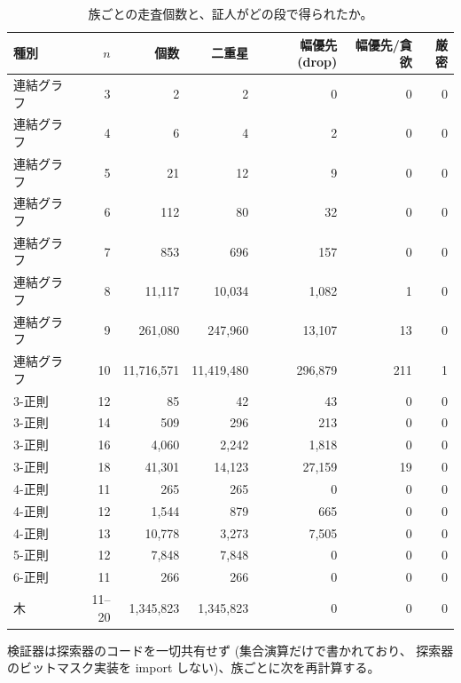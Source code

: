 \documentclass[paper=a4,fontsize=10.5pt,jafontsize=10.5pt]{jlreq}
\theoremstyle{plain}
\theoremstyle{definition}
\begin{document}
\begin{table}[t]
\centering
\caption{族ごとの走査個数と、証人がどの段で得られたか。}
\label{tab:fam}
\small
\begin{tabular}{lrrrrrr}
\hline
種別 & $n$ & 個数 & 二重星 & 幅優先 (drop) & 幅優先/貪欲 & 厳密 \\
\hline
連結グラフ & 3 & 2 & 2 & 0 & 0 & 0 \\
連結グラフ & 4 & 6 & 4 & 2 & 0 & 0 \\
連結グラフ & 5 & 21 & 12 & 9 & 0 & 0 \\
連結グラフ & 6 & 112 & 80 & 32 & 0 & 0 \\
連結グラフ & 7 & 853 & 696 & 157 & 0 & 0 \\
連結グラフ & 8 & 11,117 & 10,034 & 1,082 & 1 & 0 \\
連結グラフ & 9 & 261,080 & 247,960 & 13,107 & 13 & 0 \\
連結グラフ & 10 & 11,716,571 & 11,419,480 & 296,879 & 211 & 1 \\
3-正則 & 12 & 85 & 42 & 43 & 0 & 0 \\
3-正則 & 14 & 509 & 296 & 213 & 0 & 0 \\
3-正則 & 16 & 4,060 & 2,242 & 1,818 & 0 & 0 \\
3-正則 & 18 & 41,301 & 14,123 & 27,159 & 19 & 0 \\
4-正則 & 11 & 265 & 265 & 0 & 0 & 0 \\
4-正則 & 12 & 1,544 & 879 & 665 & 0 & 0 \\
4-正則 & 13 & 10,778 & 3,273 & 7,505 & 0 & 0 \\
5-正則 & 12 & 7,848 & 7,848 & 0 & 0 & 0 \\
6-正則 & 11 & 266 & 266 & 0 & 0 & 0 \\
木 & 11--20 & 1,345,823 & 1,345,823 & 0 & 0 & 0 \\
\hline
\end{tabular}
\end{table}

検証器は探索器のコードを一切共有せず (集合演算だけで書かれており、
探索器のビットマスク実装を import しない)、族ごとに次を再計算する。
\end{document}
